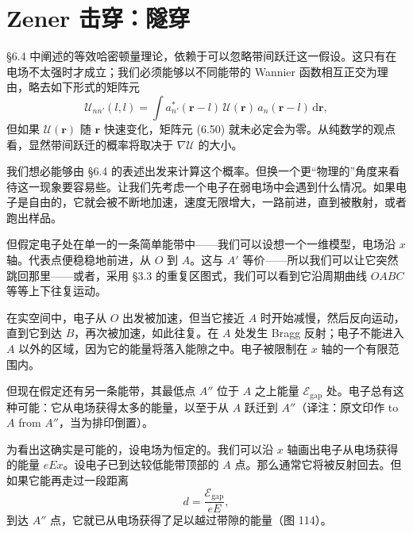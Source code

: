 
\section{Zener 击穿：隧穿}

§6.4 中阐述的等效哈密顿量理论，依赖于可以忽略带间跃迁这一假设。这只有在电场不太强时才成立；我们必须能够以不同能带的 Wannier 函数相互正交为理由，略去如下形式的矩阵元
\begin{equation*}
\mathcal{U}_{nn'}(l,l)=\int a^{*}_{n'}(\mathbf{r}-l)\,\mathcal{U}(\mathbf{r})\,a_{n}(\mathbf{r}-l)\,\mathrm{d}\mathbf{r}, \tag{6.50}
\end{equation*}
但如果 $\mathcal{U}(\mathbf{r})$ 随 $\mathbf{r}$ 快速变化，矩阵元 (6.50) 就未必定会为零。从纯数学的观点看，显然带间跃迁的概率将取决于 $\nabla\mathcal{U}$ 的大小。

我们想必能够由 §6.4 的表述出发来计算这个概率。但换一个更“物理的”角度来看待这一现象要容易些。让我们先考虑一个电子在弱电场中会遇到什么情况。如果电子是自由的，它就会被不断地加速，速度无限增大，一路前进，直到被散射，或者跑出样品。

但假定电子处在单一的一条简单能带中——我们可以设想一个一维模型，电场沿 $x$ 轴。代表点便稳稳地前进，从 $O$ 到 $A$。这与 $A'$ 等价——所以我们可以让它突然跳回那里——或者，采用 §3.3 的重复区图式，我们可以看到它沿周期曲线 $OABC$ 等等上下往复运动。


在实空间中，电子从 $O$ 出发被加速，但当它接近 $A$ 时开始减慢，然后反向运动，直到它到达 $B$，再次被加速，如此往复。在 $A$ 处发生 Bragg 反射；电子不能进入 $A$ 以外的区域，因为它的能量将落入能隙之中。电子被限制在 $x$ 轴的一个有限范围内。

但现在假定还有另一条能带，其最低点 $A''$ 位于 $A$ 之上能量 $\mathcal{E}_{\mathrm{gap}}$ 处。电子总有这种可能：它从电场获得太多的能量，以至于从 $A$ 跃迁到 $A''$（译注：原文印作 to $A$ from $A''$，当为排印倒置）。

为看出这确实是可能的，设电场为恒定的。我们可以沿 $x$ 轴画出电子从电场获得的能量 $eEx$。设电子已到达较低能带顶部的 $A$ 点。那么通常它将被反射回去。但如果它能再走过一段距离
\begin{equation*}
d=\frac{\mathcal{E}_{\mathrm{gap}}}{eE}, \tag{6.51}
\end{equation*}
到达 $A''$ 点，它就已从电场获得了足以越过带隙的能量（图 114）。

